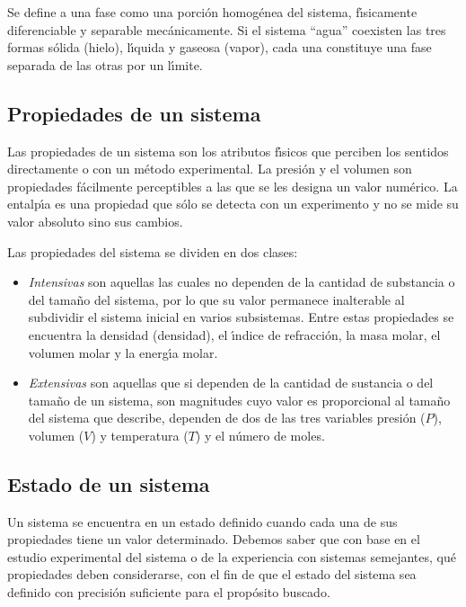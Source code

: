 Se define a una \gls{fase} como una porci\'on homog\'enea del sistema, f\'{\i}sica\-mente diferenciable y separable mec\'anicamente. Si el sistema ``agua'' coexisten las tres formas s\'olida (hielo), l\'{\i}quida y gaseosa (vapor), cada una constituye una fase separada de las otras por un l\'{\i}mite.


\subsection{Propiedades de un sistema}
Las propiedades de un sistema son los atributos f\'{\i}sicos que perciben los sentidos directamente o con un m\'etodo experimental. La presi\'on y el volumen son propiedades f\'acilmente perceptibles a las que se les designa un valor num\'erico. La entalp\'{\i}a es una propiedad que s\'olo se detecta con un experimento y no se mide su valor absoluto sino sus cambios.

Las propiedades del sistema se dividen en dos clases:

\begin{itemize}
\item \textit{Intensivas}  son aquellas las cuales no dependen de la cantidad de substancia o del tama\~no del  sistema, por lo que su valor permanece inalterable al subdividir el sistema inicial en varios subsistemas. Entre estas propiedades se encuentra la densidad (\gls{densidad}), el \'{\i}ndice de refracci\'on, la masa molar, el volumen molar y la e\-nerg\'{\i}a molar. 
\item \textit{Extensivas} son aquellas que si dependen de la cantidad de sustancia o del tama\~no de un sistema, son magnitudes cuyo valor es proporcional al tama\~no del sistema que describe, dependen de dos de las tres variables presi\'on ($P$), volumen ($V$) y temperatura ($T$) y el n\'umero de moles.
\end{itemize}

\subsection{Estado de un sistema}
Un sistema se encuentra en un estado definido cuando cada una de sus propiedades tiene un valor determinado. Debemos saber que con base en el estudio experimental del sistema o de la experiencia con sistemas semejantes, qu\'e propiedades deben considerarse, con el fin de que el estado del sistema sea definido con precisi\'on suficiente para el prop\'osito buscado.

